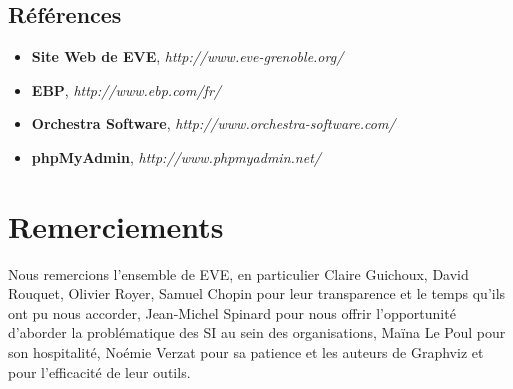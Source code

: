 \subsection{Références}

\begin{itemize}
\item \textbf{Site Web de EVE}, \textit{http://www.eve-grenoble.org/}
\item \textbf{EBP}, \textit{http://www.ebp.com/fr/}
\item \textbf{Orchestra Software}, \textit{http://www.orchestra-software.com/}
\item \textbf{phpMyAdmin}, \textit{http://www.phpmyadmin.net/}
\end{itemize}

\pagestyle{fancy}
\section*{Remerciements}

Nous remercions l'ensemble de EVE, en particulier Claire Guichoux, David Rouquet,
Olivier Royer, Samuel Chopin pour leur transparence et le temps qu'ils ont pu
nous accorder, Jean-Michel Spinard pour nous offrir l'opportunité d'aborder
la problématique des SI au sein des organisations,
Maïna Le Poul pour son hospitalité, Noémie Verzat pour sa patience et
les auteurs de Graphviz et \LaTeXe pour l'efficacité de leur outils.